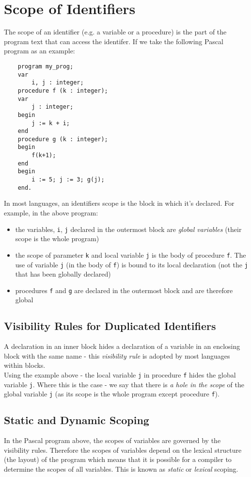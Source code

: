 \section{Scope of Identifiers}
The scope of an identifier (e.g. a variable or a procedure) is the part of the program text that can access the identifer. If we take the following Pascal program as an example:
\begin{verbatim}
    program my_prog;
    var
        i, j : integer;
    procedure f (k : integer);
    var
        j : integer;
    begin
        j := k + i;
    end
    procedure g (k : integer);
    begin
        f(k+1);
    end
    begin
        i := 5; j := 3; g(j);
    end.
\end{verbatim}
In most languages, an identifiers scope is the block in which it's declared. For example, in the above program:
\begin{itemize}
    \item the variables, \verb|i|, \verb|j| declared in the outermost block are \textit{global variables} (their scope is the whole program)
    \item the scope of parameter \verb|k| and local variable \verb|j| is the body of procedure \verb|f|. The use of variable \verb|j| (in the body of \verb|f|) is bound to its local declaration (not the \verb|j| that has been globally declared)
    \item procedures \verb|f| and \verb|g| are declared in the outermost block and are therefore global
\end{itemize}
\subsection{Visibility Rules for Duplicated Identifiers}
A declaration in an inner block hides a declaration of a variable in an enclosing block with the same name - this \textit{visibility rule} is adopted by most languages within blocks.\\

Using the example above - the local variable \verb|j| in procedure \verb|f| hides the global variable \verb|j|. Where this is the case - we say that there is \textit{a hole in the scope} of the global variable \verb|j| (as its scope is the whole program except procedure \verb|f|).

\subsection{Static and Dynamic Scoping}
In the Pascal program above, the scopes of variables are governed by the visibility rules. Therefore the scopes of variables depend on the lexical structure (the layout) of the program which means that it is possible for a compiler to determine the scopes of all variables. This is known as \textit{static} or \textit{lexical}
scoping. \\

